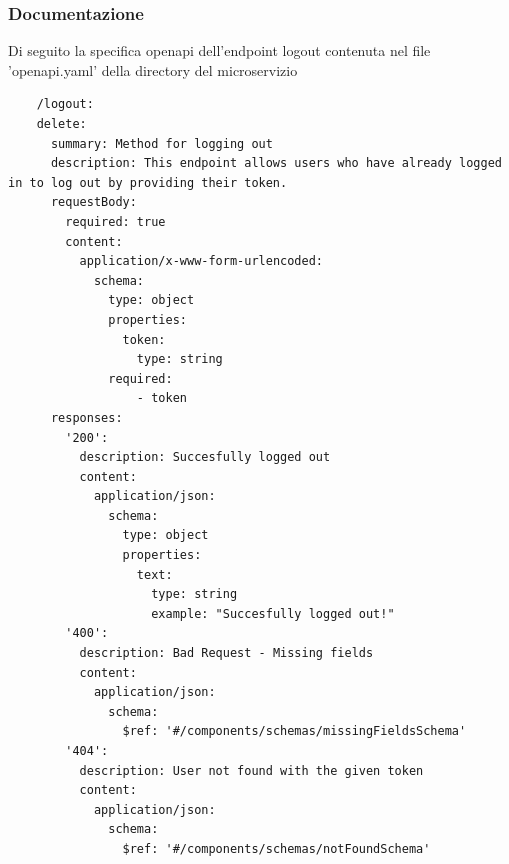 \documentclass{report}
\begin{document}
\subsubsection*{Documentazione}
Di seguito la specifica openapi dell'endpoint logout contenuta nel file 'openapi.yaml' della directory del microservizio
\begin{verbatim}
	/logout:
    delete:
      summary: Method for logging out 
      description: This endpoint allows users who have already logged in to log out by providing their token.
      requestBody:
        required: true
        content:
          application/x-www-form-urlencoded:
            schema:
              type: object
              properties:
                token:
                  type: string
              required:
                  - token
      responses:
        '200':
          description: Succesfully logged out
          content:
            application/json:
              schema:
                type: object
                properties:
                  text:
                    type: string
                    example: "Succesfully logged out!"
        '400':
          description: Bad Request - Missing fields 
          content:
            application/json:
              schema:
                $ref: '#/components/schemas/missingFieldsSchema'
        '404':
          description: User not found with the given token
          content:
            application/json:
              schema:
                $ref: '#/components/schemas/notFoundSchema'
	
\end{verbatim}
\end{document}
